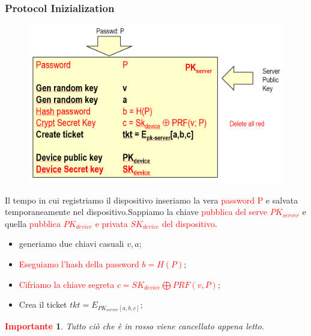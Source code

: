 \documentclass{book}
\newtheorem*{Importante}{\textbf{\textcolor{red}{Importante}}}
\begin{document}
\subsubsection{Protocol Inizialization}
\begin{figure}[h]
	\centering
	\includegraphics[scale=0.5]{2022-01-06-16-51-03.png}%
\end{figure}
Il tempo in cui registriamo il dispositivo inseriamo la vera \textcolor{red}{password P} e salvata temporaneamente nel dispositivo\@.Sappiamo la chiave \textcolor{red}{pubblica del serve \(PK_{server}\)} e quella \textcolor{red}{pubblica \(PK_{device}\) e privata \(SK_{device}\) del dispositivo}\@.
\begin{itemize}
	\item generiamo due chiavi casuali \(v,a\);
	\item \textcolor{red}{Eseguiamo l'hash della password \(b=H(P)\)};
	\item \textcolor{red}{Cifriamo la chiave segreta \(c=SK_{device}\bigoplus PRF(v,P)\)};
	\item Crea il ticket \(tkt=E_{PK_{server}[a,b,c]}\);
\end{itemize}
\begin{Importante}
	Tutto ciò che è in rosso viene cancellato appena letto.
\end{Importante}
\newpage
\end{document}
